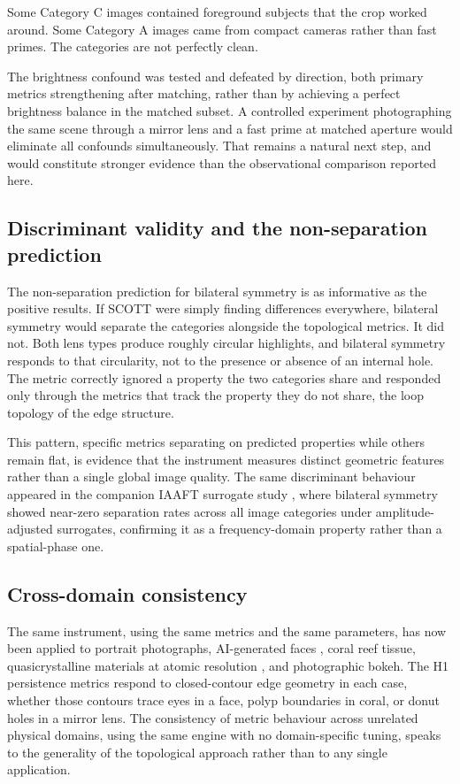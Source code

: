 \documentclass[11pt,a4paper]{article}
\begin{document}
Some Category C images contained foreground subjects that the crop worked around. Some Category A images came from compact cameras rather than fast primes. The categories are not perfectly clean.

The brightness confound was tested and defeated by direction, both primary metrics strengthening after matching, rather than by achieving a perfect brightness balance in the matched subset. A controlled experiment photographing the same scene through a mirror lens and a fast prime at matched aperture would eliminate all confounds simultaneously. That remains a natural next step, and would constitute stronger evidence than the observational comparison reported here.

\subsection{Discriminant validity and the non-separation prediction}
\label{sec:discriminant}

The non-separation prediction for bilateral symmetry is as informative as the positive results. If SCOTT were simply finding differences everywhere, bilateral symmetry would separate the categories alongside the topological metrics. It did not. Both lens types produce roughly circular highlights, and bilateral symmetry responds to that circularity, not to the presence or absence of an internal hole. The metric correctly ignored a property the two categories share and responded only through the metrics that track the property they do not share, the loop topology of the edge structure.

This pattern, specific metrics separating on predicted properties while others remain flat, is evidence that the instrument measures distinct geometric features rather than a single global image quality. The same discriminant behaviour appeared in the companion IAAFT surrogate study \cite{cundill2026b}, where bilateral symmetry showed near-zero separation rates across all image categories under amplitude-adjusted surrogates, confirming it as a frequency-domain property rather than a spatial-phase one.

\subsection{Cross-domain consistency}

The same instrument, using the same metrics and the same parameters, has now been applied to portrait photographs, AI-generated faces \cite{cundill2026a}, coral reef tissue, quasicrystalline materials at atomic resolution \cite{cundill2026b}, and photographic bokeh. The H1 persistence metrics respond to closed-contour edge geometry in each case, whether those contours trace eyes in a face, polyp boundaries in coral, or donut holes in a mirror lens. The consistency of metric behaviour across unrelated physical domains, using the same engine with no domain-specific tuning, speaks to the generality of the topological approach rather than to any single application.
\end{document}
